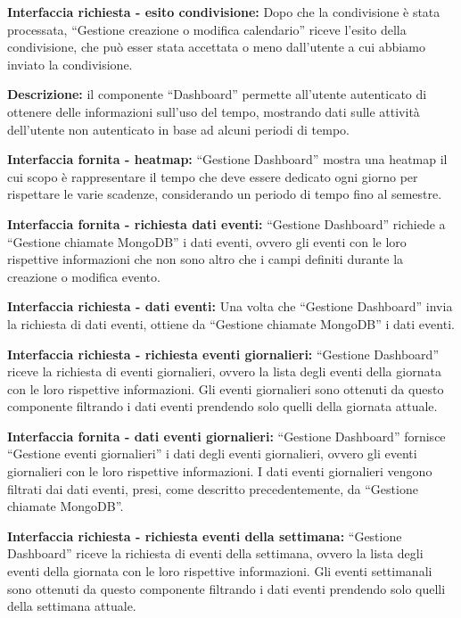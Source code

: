 \begin{listaPersonale}[DCI]{}
    \textbf{Interfaccia richiesta - esito condivisione:} Dopo che la condivisione è stata processata, “Gestione creazione o modifica calendario” riceve l'esito della condivisione, che può esser stata accettata o meno dall'utente a cui abbiamo inviato la condivisione.



    \textbf{Descrizione:} il componente “Dashboard” permette all'utente autenticato di ottenere delle informazioni sull'uso del tempo,  mostrando dati sulle attività dell'utente non autenticato in base ad alcuni periodi di tempo.

    \textbf{Interfaccia fornita - heatmap:}  “Gestione Dashboard” mostra una heatmap il cui scopo è rappresentare il tempo che deve essere dedicato ogni giorno per rispettare le varie scadenze, considerando un periodo di tempo fino al semestre.

    \textbf{Interfaccia fornita - richiesta dati eventi:} “Gestione Dashboard” richiede a “Gestione chiamate MongoDB” i dati eventi, ovvero gli eventi con le loro rispettive informazioni che non sono altro che i campi definiti durante la creazione o modifica evento.

    \textbf{Interfaccia richiesta - dati eventi:} Una volta che “Gestione Dashboard” invia la richiesta di dati eventi, ottiene da “Gestione chiamate MongoDB” i dati eventi.

    \textbf{Interfaccia richiesta - richiesta eventi giornalieri:} “Gestione Dashboard” riceve la richiesta di eventi giornalieri, ovvero la lista degli eventi della giornata con le loro rispettive informazioni.
    Gli eventi giornalieri sono ottenuti da questo componente filtrando i dati eventi prendendo solo quelli della giornata attuale.

    \textbf{Interfaccia fornita - dati eventi giornalieri:} “Gestione Dashboard” fornisce “Gestione eventi giornalieri” i dati degli eventi giornalieri, ovvero gli eventi giornalieri con le loro rispettive informazioni. I dati eventi giornalieri vengono filtrati dai dati eventi, presi, come descritto precedentemente, da “Gestione chiamate MongoDB”.

    \textbf{Interfaccia richiesta - richiesta eventi della settimana:} “Gestione Dashboard” riceve la richiesta di eventi della settimana, ovvero la lista degli eventi della giornata con le loro rispettive informazioni. Gli eventi settimanali sono ottenuti da questo componente filtrando i dati eventi prendendo solo quelli della settimana attuale.


\end{listaPersonale}
